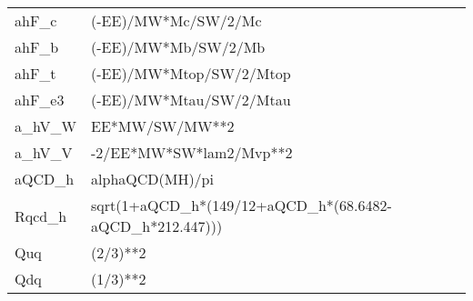 \begin{tabular}{|l|l|l|}
ahF_c &(-EE)/MW*Mc/SW/2/Mc & \\
ahF_b &(-EE)/MW*Mb/SW/2/Mb & \\
ahF_t &(-EE)/MW*Mtop/SW/2/Mtop& \\
ahF_e3&(-EE)/MW*Mtau/SW/2/Mtau& \\
a_hV_W&EE*MW/SW/MW**2      & \\
a_hV_V&-2/EE*MW*SW*lam2/Mvp**2& \\
aQCD_h&alphaQCD(MH)/pi     & \\
Rqcd_h&sqrt(1+aQCD_h*(149/12+aQCD_h*(68.6482-aQCD_h*212.447)))& \\
Quq   &(2/3)**2            & \\
Qdq   &(1/3)**2            & \\ \hline
\end{tabular}

